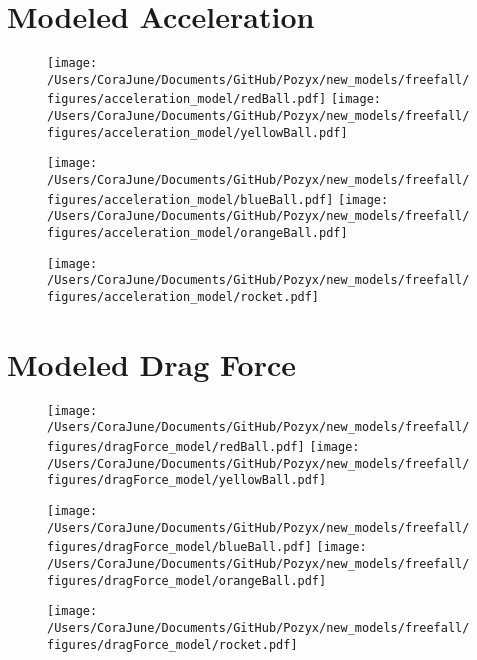 \documentclass{article}
\begin{document}
\section{Modeled Acceleration}
\begin{figure}[h!]
\begin{multicols}{2}
    \texttt{[image: /Users/CoraJune/Documents/GitHub/Pozyx/new\_models/freefall/figures/acceleration\_model/redBall.pdf]}
    \texttt{[image: /Users/CoraJune/Documents/GitHub/Pozyx/new\_models/freefall/figures/acceleration\_model/yellowBall.pdf]}
\end{multicols}

\begin{multicols}{2}
    \texttt{[image: /Users/CoraJune/Documents/GitHub/Pozyx/new\_models/freefall/figures/acceleration\_model/blueBall.pdf]}
    \texttt{[image: /Users/CoraJune/Documents/GitHub/Pozyx/new\_models/freefall/figures/acceleration\_model/orangeBall.pdf]}
\end{multicols}

\texttt{[image: /Users/CoraJune/Documents/GitHub/Pozyx/new\_models/freefall/figures/acceleration\_model/rocket.pdf]}
\end{figure}
\newpage
\section{Modeled Drag Force}
\begin{figure}[h!]
\begin{multicols}{2}
    \texttt{[image: /Users/CoraJune/Documents/GitHub/Pozyx/new\_models/freefall/figures/dragForce\_model/redBall.pdf]}
    \texttt{[image: /Users/CoraJune/Documents/GitHub/Pozyx/new\_models/freefall/figures/dragForce\_model/yellowBall.pdf]}
\end{multicols}

\begin{multicols}{2}
    \texttt{[image: /Users/CoraJune/Documents/GitHub/Pozyx/new\_models/freefall/figures/dragForce\_model/blueBall.pdf]}
    \texttt{[image: /Users/CoraJune/Documents/GitHub/Pozyx/new\_models/freefall/figures/dragForce\_model/orangeBall.pdf]}
\end{multicols}

\texttt{[image: /Users/CoraJune/Documents/GitHub/Pozyx/new\_models/freefall/figures/dragForce\_model/rocket.pdf]}
\end{figure}
\newpage
\end{document}
